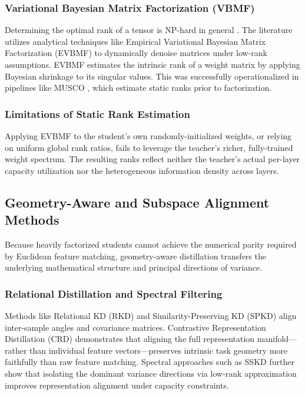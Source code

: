 \documentclass[conference]{IEEEtran}
\begin{document}
\subsubsection{Variational Bayesian Matrix Factorization (VBMF)}
\par
Determining the optimal rank of a tensor is NP-hard in general \cite{hillar2013most}. The literature utilizes analytical techniques like Empirical Variational Bayesian Matrix Factorization (EVBMF) \cite{nakajima2013global} to dynamically denoise matrices under low-rank assumptions. EVBMF estimates the intrinsic rank of a weight matrix by applying Bayesian shrinkage to its singular values. This was successfully operationalized in pipelines like MUSCO \cite{gusak2019automated}, which estimate static ranks prior to factorization.


\subsubsection{Limitations of Static Rank Estimation}
\par
Applying EVBMF to the student's own randomly-initialized weights, or relying on uniform global rank ratios, fails to leverage the teacher's richer, fully-trained weight spectrum. The resulting ranks reflect neither the teacher's actual per-layer capacity utilization nor the heterogeneous information density across layers.


\subsection{Geometry-Aware and Subspace Alignment Methods}
\par
Because heavily factorized students cannot achieve the numerical parity required by Euclidean feature matching, geometry-aware distillation transfers the underlying mathematical structure and principal directions of variance.


\subsubsection{Relational Distillation and Spectral Filtering}
\par
Methods like Relational KD (RKD) \cite{park2019relational} and Similarity-Preserving KD (SPKD) \cite{tung2019similarity} align inter-sample angles and covariance matrices. Contrastive Representation Distillation (CRD) \cite{tian2019contrastive} demonstrates that aligning the full representation manifold—rather than individual feature vectors—preserves intrinsic task geometry more faithfully than raw feature matching. Spectral approaches such as SSKD \cite{xu2020knowledge} further show that isolating the dominant variance directions via low-rank approximation improves representation alignment under capacity constraints.
\end{document}
